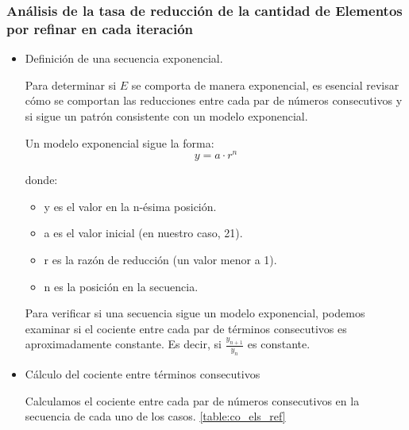 \subsubsection{ Análisis de la tasa de reducción de la cantidad de Elementos por refinar en cada iteración }

\begin{itemize}
    \item Definición de una secuencia exponencial.

    Para determinar si $E$ se comporta de manera exponencial, es esencial revisar cómo se comportan las reducciones entre cada par de números consecutivos y si sigue un patrón consistente con un modelo exponencial.

    Un modelo exponencial sigue la forma:
    $$y = a \cdot r^n$$
     
    donde:
    
    \begin{itemize}
        \item y es el valor en la n-ésima posición.
        \item a es el valor inicial (en nuestro caso, 21).
        \item r es la razón de reducción (un valor menor a 1).
        \item n es la posición en la secuencia.
    \end{itemize}
    
    Para verificar si una secuencia sigue un modelo exponencial, podemos examinar si el cociente entre cada par de términos consecutivos es aproximadamente constante. Es decir, si $\frac{y_{n+1}}{y_n}$ es constante.

    \item Cálculo del cociente entre términos consecutivos

    Calculamos el cociente entre cada par de números consecutivos en la secuencia de cada uno de los casos. \autoref{table:co_els_ref}


\end{itemize}
